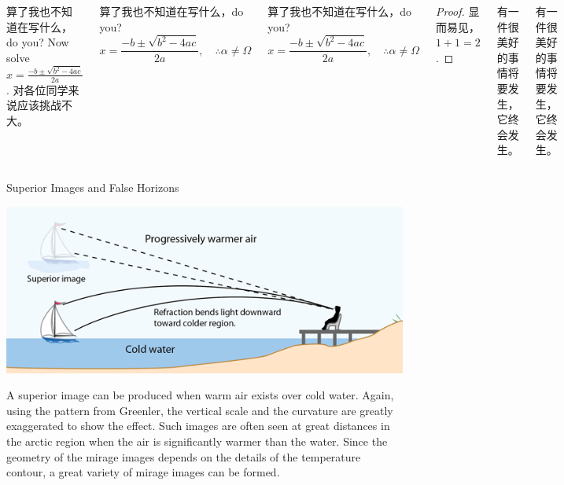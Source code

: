 \documentclass[linespread=1.4]{ctexbeamer}
\begin{document}
\begin{frame}
\begin{columns}[T]
\begin{exampleblock}{算了我也不知道在写什么，do you?}
Now solve $x = \frac{-b \pm \sqrt{b^2 -4ac}}{2a}$. 对各位同学来说应该挑战不大。
\end{exampleblock}

\begin{alertblock}{算了我也不知道在写什么，do you?}
\[ x = \frac{-b \pm \sqrt{b^2 -4ac}}{2a}, \quad\therefore \alpha \neq \Omega \]
\end{alertblock}

\begin{block}{算了我也不知道在写什么，do you?}
\[ x = \frac{-b \pm \sqrt{b^2 -4ac}}{2a}, \quad\therefore \alpha \neq \Omega \]
\end{block}

\begin{proof}
显而易见，$1+1=2$.
\end{proof}

\begin{theorem}
有一件很美好的事情将要发生，它终会发生。
\end{theorem}

\begin{definition}
有一件很美好的事情将要发生，它终会发生。
\end{definition}

\end{columns}

\begin{block}{Superior Images and False Horizons \citep{Mirage-Greenler1980,AtmRefrac-Hyperphysics}}
\begin{center}\includegraphics[width=0.95\hsize]{miragesup.png}\end{center}
\linespread{1}\selectfont
A superior image can be produced when warm air exists over cold water. Again, using the pattern from Greenler, the vertical scale and the curvature are greatly exaggerated to show the effect. Such images are often seen at great distances in the arctic region when the air is significantly warmer than the water. Since the geometry of the mirage images depends on the details of the temperature contour, a great variety of mirage images can be formed.


\end{block}
\end{frame}
\end{document}
